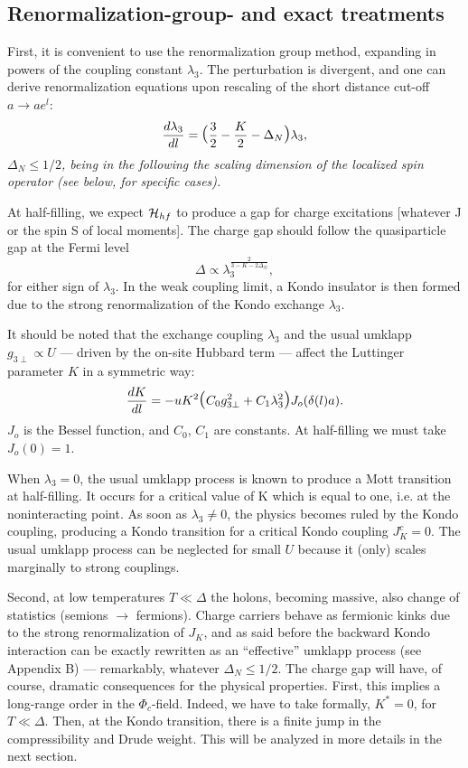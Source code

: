 \subsection{Renormalization-group- and exact treatments}

First, it is convenient to use
the renormalization group method, expanding in powers of the coupling
constant $\lambda_3$. The perturbation is divergent, and one can derive
renormalization equations upon rescaling of the short distance cut-off 
$a\rightarrow a e^l$:
\begin{equation}
\label{reclaw}
\frac{d\lambda_3}{dl}=\hbox{\Large(}\frac{3}{2}-\frac{K}{2}-\Delta_N
\hbox{\Large)}\lambda_3,
\end{equation}
\emph{$\Delta_N\leq 1/2$, being in the following
the scaling dimension of the localized spin operator (see below, for specific
cases).} 

At half-filling, we expect
${\cal H}_{hf}$ to produce a gap for charge excitations [whatever
J or the spin S of local moments]. The charge gap should
follow the quasiparticle gap at the Fermi level
\begin{equation}
\label{gap}
\Delta\propto \lambda_3^{\frac{2}{3-K-2\Delta_N}},
\end{equation}
for either sign of $\lambda_3$. In the weak coupling limit,
a Kondo insulator is then formed 
due to the strong renormalization of the Kondo exchange $\lambda_3$. 

It should be noted that
the exchange coupling $\lambda_3$
and the usual umklapp $g_{3\perp}\propto U$ --- driven by the on-site
Hubbard term --- affect the Luttinger parameter $K$ in a symmetric
way:
\begin{equation}
\label{K}
\frac{dK}{dl}=-u K^2\hbox{\Large(}C_0g_{3\perp}^2+C_1\lambda_3^2\hbox{\Large)}
J_o(\delta(l)a).
\end{equation}
$J_o$ is the Bessel function, and $C_0$, $C_1$ are constants. 
At half-filling we must take $J_o(0)=1$.

When $\lambda_3=0$, the usual umklapp process 
is known to produce a Mott
transition at half-filling. It occurs for a critical value of K
which is equal to one, i.e. at the noninteracting point. 
As soon as $\lambda_3\neq 0$, the
physics becomes ruled by the Kondo coupling, producing a Kondo 
transition for a critical Kondo coupling $J_K^c=0$. 
The usual umklapp process 
can be neglected for small $U$ because it (only)
scales marginally to strong couplings.

Second, at low temperatures $T\ll\Delta$ the holons, becoming 
massive, also change
of statistics (semions $\rightarrow$ fermions). Charge carriers
behave as fermionic kinks due to the strong
renormalization of $J_K$, and as said before the backward Kondo
interaction can be exactly rewritten as an ``effective''
umklapp process (see Appendix B) --- remarkably, whatever $\Delta_N\leq 1/2$.
The charge gap will have, of
course, dramatic consequences for the physical properties. First, this implies
a long-range order in the $\Phi_c$-field. Indeed, we have
to take formally, $K^*=0$, for $T\ll\Delta$.
Then, at the Kondo transition, 
there is a finite jump in the compressibility and Drude weight. This will be
analyzed in more details in the next section.

